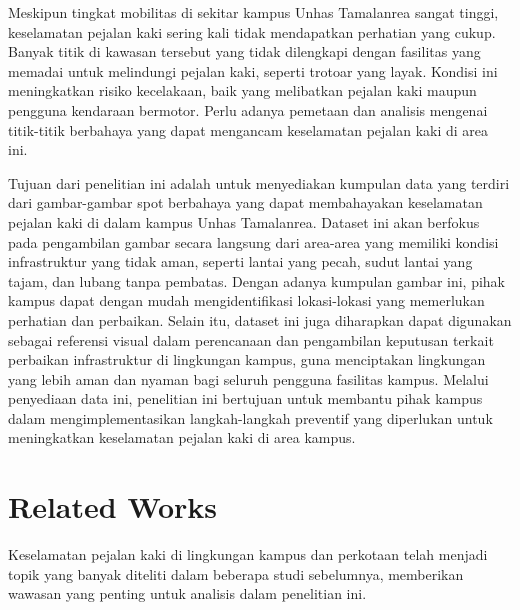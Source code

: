 \documentclass[12pt,a4paper]{article}
\begin{document}
Meskipun tingkat mobilitas di sekitar kampus Unhas Tamalanrea sangat tinggi, keselamatan pejalan kaki sering kali tidak mendapatkan perhatian yang cukup. Banyak titik di kawasan tersebut yang tidak dilengkapi dengan fasilitas yang memadai untuk melindungi pejalan kaki, seperti trotoar yang layak. Kondisi ini meningkatkan risiko kecelakaan, baik yang melibatkan pejalan kaki maupun pengguna kendaraan bermotor. Perlu adanya pemetaan dan analisis mengenai titik-titik berbahaya yang dapat mengancam keselamatan pejalan kaki di area ini.

Tujuan dari penelitian ini adalah untuk menyediakan kumpulan data yang terdiri dari gambar-gambar spot berbahaya yang dapat membahayakan keselamatan pejalan kaki di dalam kampus Unhas Tamalanrea. Dataset ini akan berfokus pada pengambilan gambar secara langsung dari area-area yang memiliki kondisi infrastruktur yang tidak aman, seperti lantai yang pecah, sudut lantai yang tajam, dan lubang tanpa pembatas. Dengan adanya kumpulan gambar ini, pihak kampus dapat dengan mudah mengidentifikasi lokasi-lokasi yang memerlukan perhatian dan perbaikan. Selain itu, dataset ini juga diharapkan dapat digunakan sebagai referensi visual dalam perencanaan dan pengambilan keputusan terkait perbaikan infrastruktur di lingkungan kampus, guna menciptakan lingkungan yang lebih aman dan nyaman bagi seluruh pengguna fasilitas kampus. Melalui penyediaan data ini, penelitian ini bertujuan untuk membantu pihak kampus dalam mengimplementasikan langkah-langkah preventif yang diperlukan untuk meningkatkan keselamatan pejalan kaki di area kampus.

\newpage
\section{Related Works}
Keselamatan pejalan kaki di lingkungan kampus dan perkotaan telah menjadi topik yang banyak diteliti dalam beberapa studi sebelumnya, memberikan wawasan yang penting untuk analisis dalam penelitian ini. 
\end{document}

